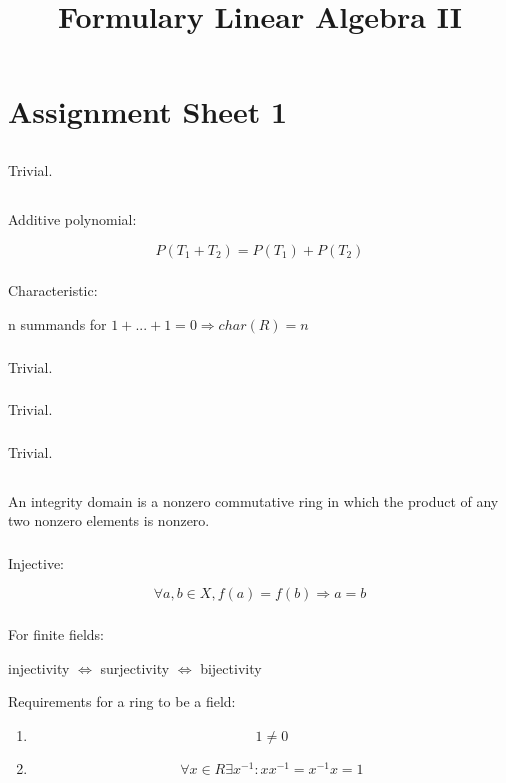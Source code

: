 \documentclass{report}
\title{Formulary Linear Algebra II}
\begin{document}
\chapter{Assignment Sheet 1}

\section{}
Trivial.
\section{}
Additive polynomial:

$$P(T_1 + T_2)=P(T_1)+P(T_2)$$
\subsection{}
Characteristic:

n summands for $1+...+1=0 \Rightarrow char(R)=n$
\subsection{}
Trivial.
\subsection{}
Trivial.
\subsection{}
Trivial.
\section{}
An integrity domain is a nonzero commutative ring in which the product of any two nonzero elements is nonzero.
\subsection{}
Injective:

$$\forall a,b \in X,f(a)=f(b) \Rightarrow a=b$$
\subsection{}
For finite fields:

injectivity $\Leftrightarrow$ surjectivity $\Leftrightarrow$ bijectivity

Requirements for a ring to be a field:

\begin{enumerate}
\item $$1\neq0$$
\item $$\forall x\in R \exists x^{-1}:xx^{-1}=x^{-1}x=1$$
\end{enumerate}
\end{document}
